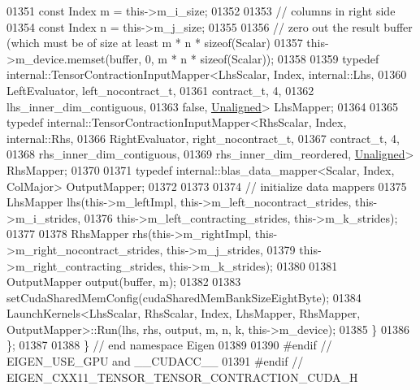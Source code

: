 \begin{DoxyCode}
01351     \textcolor{keyword}{const} Index m = this->m\_i\_size;
01352 
01353     \textcolor{comment}{// columns in right side}
01354     \textcolor{keyword}{const} Index n = this->m\_j\_size;
01355 
01356     \textcolor{comment}{// zero out the result buffer (which must be of size at least m * n * sizeof(Scalar)}
01357     this->m\_device.memset(buffer, 0, m * n * \textcolor{keyword}{sizeof}(Scalar));
01358 
01359     \textcolor{keyword}{typedef} internal::TensorContractionInputMapper<LhsScalar, Index, internal::Lhs,
01360                                                    LeftEvaluator, left\_nocontract\_t,
01361                                                    contract\_t, 4,
01362                                                    lhs\_inner\_dim\_contiguous,
01363                                                    \textcolor{keyword}{false}, \hyperlink{group__enums_gga45fe06e29902b7a2773de05ba27b47a1ac935220b4c844108e183ebe30a4d5204}{Unaligned}> LhsMapper;
01364 
01365     \textcolor{keyword}{typedef} internal::TensorContractionInputMapper<RhsScalar, Index, internal::Rhs,
01366                                                    RightEvaluator, right\_nocontract\_t,
01367                                                    contract\_t, 4,
01368                                                    rhs\_inner\_dim\_contiguous,
01369                                                    rhs\_inner\_dim\_reordered, 
      \hyperlink{group__enums_gga45fe06e29902b7a2773de05ba27b47a1ac935220b4c844108e183ebe30a4d5204}{Unaligned}> RhsMapper;
01370 
01371     \textcolor{keyword}{typedef} internal::blas\_data\_mapper<Scalar, Index, ColMajor> OutputMapper;
01372 
01373 
01374     \textcolor{comment}{// initialize data mappers}
01375     LhsMapper lhs(this->m\_leftImpl, this->m\_left\_nocontract\_strides, this->m\_i\_strides,
01376                   this->m\_left\_contracting\_strides, this->m\_k\_strides);
01377 
01378     RhsMapper rhs(this->m\_rightImpl, this->m\_right\_nocontract\_strides, this->m\_j\_strides,
01379                   this->m\_right\_contracting\_strides, this->m\_k\_strides);
01380 
01381     OutputMapper output(buffer, m);
01382 
01383     setCudaSharedMemConfig(cudaSharedMemBankSizeEightByte);
01384     LaunchKernels<LhsScalar, RhsScalar, Index, LhsMapper, RhsMapper, OutputMapper>::Run(lhs, rhs, output,  
      m, n, k, this->m\_device);
01385   \}
01386 \};
01387 
01388 \} \textcolor{comment}{// end namespace Eigen}
01389 
01390 \textcolor{preprocessor}{#endif // EIGEN\_USE\_GPU and \_\_CUDACC\_\_}
01391 \textcolor{preprocessor}{#endif // EIGEN\_CXX11\_TENSOR\_TENSOR\_CONTRACTION\_CUDA\_H}
\end{DoxyCode}
